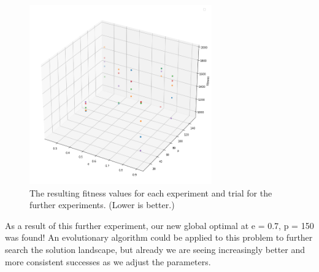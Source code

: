 \documentclass[a4paper, 11pt]{article}
\begin{document}
\begin{figure}[h]
    \centering
    \includegraphics[width=0.7\textwidth]{figs/furtherexperiment2.png}
    \caption{The resulting fitness values for each experiment and trial for the further experiments. (Lower is better.)}
    \label{furtherexperiment2}
\end{figure}

As a result of this further experiment, our new global optimal at e = 0.7, p = 150 was found! An evolutionary algorithm could be applied to this problem to further search the solution landscape, but already we are seeing increasingly better and more consistent successes as we adjust the parameters.



\end{document}
